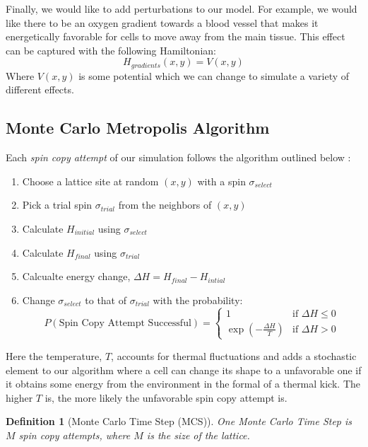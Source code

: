\documentclass[12pt]{article}
\newtheorem{definition}{Definition}
\begin{document}
Finally, we would like to add perturbations to our model. For example, we would like there to be an oxygen gradient towards a blood vessel that makes it energetically favorable for cells to move away from the main tissue. This effect can be captured with the following Hamiltonian:
\begin{equation}
	H_{gradients}(x,y) = V(x,y)
\end{equation}
Where $V(x,y)$ is some potential which we can change to simulate a variety of different effects.

\subsection{Monte Carlo Metropolis Algorithm}
Each \emph{spin copy attempt} of our simulation follows the algorithm outlined below \cite{Glazier2007}:

\begin{enumerate}
  \item Choose a lattice site at random $(x,y)$ with a spin $\sigma_{select}$
  \item Pick a trial spin $\sigma_{trial}$ from the neighbors of $(x,y)$
  \item Calculate $H_{initial}$ using $\sigma_{select}$
  \item Calculate $H_{final}$ using $\sigma_{trial}$
  \item Calcualte energy change, $\Delta H = H_{final} - H_{intial}$
  \item{ Change $\sigma_{select}$ to that of $\sigma_{trial}$ with the probability:
  \[
 		P(\text{Spin Copy Attempt Successful}) =
  	\begin{cases}
   		1 & \text{if } \Delta H \leq 0 \\
   		\exp{(-\frac{\Delta H}{T})}       & \text{if } \Delta H > 0
  	\end{cases}
	\]
}
\end{enumerate}

Here the temperature, $T$, accounts for thermal fluctuations and adds a stochastic element to our algorithm where a cell can change its shape to a unfavorable one if it obtains some energy from the environment in the formal of a thermal kick. The higher $T$ is, the more likely the unfavorable spin copy attempt is.

\begin{definition}[Monte Carlo Time Step (MCS)] One Monte Carlo Time Step is $M$ spin copy attempts, where $M$ is the size of the lattice.
\end{definition}
\end{document}
